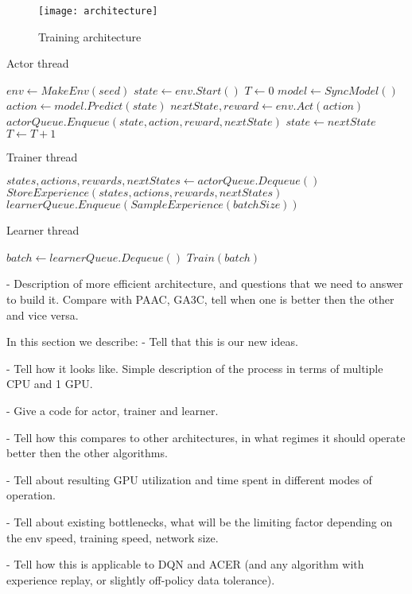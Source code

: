 \begin{figure}[h!]
\caption{Training architecture}
\texttt{[image: architecture]}
\end{figure}

\begin{algorithm}
    \caption{Actor thread}\label{actor}
    \begin{algorithmic}[1]
        \State $env \gets MakeEnv(seed)$
        \State $state \gets env.Start()$
        \State $T \gets 0$
                \State $model \gets SyncModel()$
            \EndIf
            \State $action \gets model.Predict(state)$
            \State $nextState, reward \gets env.Act(action)$
            \State $actorQueue.Enqueue(state, action, reward, nextState)$
            \State $state \gets nextState$
            \State $T \gets T + 1$
        \EndWhile
    \end{algorithmic}
\end{algorithm}

\begin{algorithm}
    \caption{Trainer thread}\label{trainer}
    \begin{algorithmic}[1]
            \State $states, actions, rewards, nextStates \gets actorQueue.Dequeue()$
            \State $StoreExperience(states, actions, rewards, nextStates)$
            \State $learnerQueue.Enqueue(SampleExperience(batchSize))$
        \EndWhile
    \end{algorithmic}
\end{algorithm}

\begin{algorithm}
    \caption{Learner thread}\label{learner}
    \begin{algorithmic}[1]
            \State $batch \gets learnerQueue.Dequeue()$
            \State $Train(batch)$
        \EndFor
    \end{algorithmic}
\end{algorithm}

- Description of more efficient architecture, and questions that we need to
  answer to build it. Compare with PAAC, GA3C, tell when one is better then
  the other and vice versa.

In this section we describe:
- Tell that this is our new ideas.

- Tell how it looks like. Simple description of the process in terms of multiple CPU and 1 GPU.

- Give a code for actor, trainer and learner.

- Tell how this compares to other architectures, in what regimes it should operate better then
the other algorithms.

- Tell about resulting GPU utilization and time spent in different modes of operation.

- Tell about existing bottlenecks, what will be the limiting factor depending on the env speed,
training speed, network size.

- Tell how this is applicable to DQN and ACER (and any algorithm with experience replay, or
slightly off-policy data tolerance).
